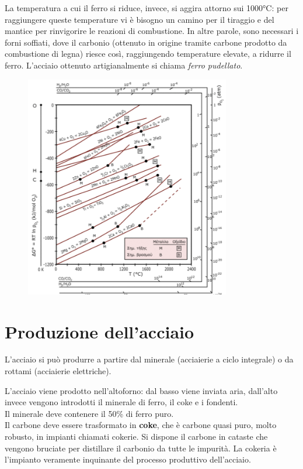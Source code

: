 La temperatura a cui il ferro si riduce, invece, si aggira attorno sui 1000°C: per raggiungere queste temperature vi è bisogno un camino per il tiraggio e del mantice per rinvigorire le reazioni di combustione. In altre parole, sono necessari i forni soffiati, dove il carbonio (ottenuto in origine tramite carbone prodotto da combustione di legna) riesce così, raggiungendo temperature elevate, a ridurre il ferro. L’acciaio ottenuto artigianalmente si chiama \textit{ferro pudellato}.
\begin{figure}[!hbt]
    \includegraphics[width=0.8\textwidth]{images/img25.png}
    \caption{}
\end{figure}

\section{Produzione dell'acciaio}\label{steel_prod}

L’acciaio si può produrre a partire dal minerale (acciaierie a ciclo integrale) o da rottami (acciaierie elettriche).

L’acciaio viene prodotto nell’altoforno: dal basso viene inviata aria, dall’alto invece vengono introdotti il minerale di ferro, il coke e i fondenti.\\
Il minerale deve contenere il 50\% di ferro puro.\\
Il carbone deve essere trasformato in \textbf{coke}, che è carbone quasi puro, molto robusto, in impianti chiamati cokerie. Si dispone il carbone in cataste che vengono bruciate per distillare il carbonio da tutte le impurità. La cokeria è l’impianto veramente inquinante del processo produttivo dell’acciaio.

